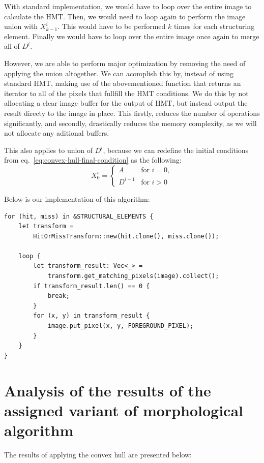 \documentclass[12pt]{article}
\begin{document}
With standard implementation, we would have to loop over the entire image to calculate the HMT.
Then, we would need to loop again to perform the image union with $X^i_{k-1}$.
This would have to be performed $k$ times for each structuring element.
Finally we would have to loop over the entire image once again to merge all of $D^i$.

However, we are able to perform major optimization by removing the need of applying the union altogether.
We can acomplish this by, instead of using standard HMT, making use of the abovementioned function that returns an iterator to all of the pixels that fullfill the HMT conditions.
We do this by not allocating a clear image buffer for the output of HMT, but instead output the result directy to the image in place.
This firstly, reduces the number of operations significantly, and secondly, drastically reduces the memory complexity, as we will not allocate any aditional buffers.

This also applies to union of $D^i$, because we can redefine the initial conditions from eq.~\eqref{eq:convex-hull-final-condition} as the following:
\begin{equation*}
    X^i_0 =
    \begin{cases}
        A       & \text{for $i = 0$}, \\
        D^{i-1} & \text{for $i > 0$}
    \end{cases}
\end{equation*}

\pagebreak[2]
Below is our implementation of this algorithm:
\begin{lstlisting}
for (hit, miss) in &STRUCTURAL_ELEMENTS {
    let transform = 
        HitOrMissTransform::new(hit.clone(), miss.clone());

    loop {
        let transform_result: Vec<_> = 
            transform.get_matching_pixels(image).collect();
        if transform_result.len() == 0 {
            break;
        }
        for (x, y) in transform_result {
            image.put_pixel(x, y, FOREGROUND_PIXEL);
        }
    }
}
\end{lstlisting}

\section{Analysis of the results of the assigned variant of morphological algorithm}
\label{sec:convex-hull-analysis}

The results of applying the convex hull are presented below:
\end{document}
